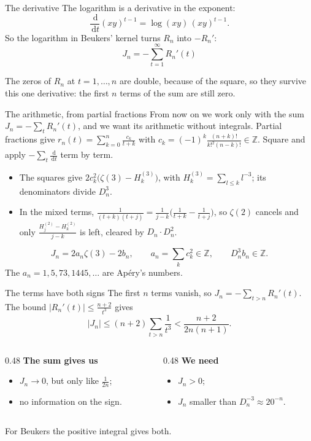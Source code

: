 \documentclass[aspectratio=169,11pt]{beamer}
\newcommand{\Z}{\mathbb{Z}}
\newcommand{\dd}{\,\mathrm{d}}
\newcommand{\Dn}{D_n}
\begin{document}
\begin{frame}{The derivative}
  The logarithm is a derivative in the exponent:
  \[
    \frac{\dd}{\dd t}(xy)^{t-1}=\log(xy)\,(xy)^{t-1}.
  \]
  So the logarithm in Beukers' kernel turns $R_n$ into $-R_n'$:
  \[
    \boxed{\;J_n=-\sum_{t=1}^\infty R_n'(t)\;}
  \]

  \pause
  The zeros of $R_n$ at $t=1,\dots,n$ are double, because of the square, so they survive this one
  derivative: the first $n$ terms of the sum are still zero.
\end{frame}

\begin{frame}{The arithmetic, from partial fractions}
  From now on we work only with the sum $J_n=-\sum_tR_n'(t)$, and we want its arithmetic without
  integrals. Partial fractions give
  $r_n(t)=\sum_{k=0}^n\frac{c_k}{t+k}$ with $c_k=(-1)^k\frac{(n+k)!}{k!^2(n-k)!}\in\Z$.
  Square and apply $-\sum_t\frac{\dd}{\dd t}$ term by term.
  \begin{itemize}
    \item The squares give $2c_k^2\bigl(\zeta(3)-H_k^{(3)}\bigr)$, with $H_k^{(3)}=\sum_{l\le k}l^{-3}$; its
      denominators divide $\Dn^3$.
    \item In the mixed terms, $\frac1{(t+k)(t+j)}=\frac1{j-k}\bigl(\frac1{t+k}-\frac1{t+j}\bigr)$, so $\zeta(2)$
      cancels and only $\frac{H_j^{(2)}-H_k^{(2)}}{j-k}$ is left, cleared by $\Dn\cdot\Dn^2$.
  \end{itemize}
  \[
    J_n=2a_n\zeta(3)-2b_n,\qquad a_n=\sum_kc_k^2\in\Z,\qquad \Dn^3b_n\in\Z .
  \]
  The $a_n=1,5,73,1445,\dots$ are Ap\'ery's numbers.
\end{frame}

\begin{frame}{The terms have both signs}
  The first $n$ terms vanish, so $J_n=-\sum_{t>n}R_n'(t)$. The bound
  $|R_n'(t)|\le\frac{n+2}{t^3}$ gives
  \[
    |J_n|\le(n+2)\sum_{t>n}\frac1{t^3}<\frac{n+2}{2n(n+1)} .
  \]
  \pause
  \begin{columns}[T]
    \begin{column}{0.48\textwidth}
      \textbf{The sum gives us}
      \begin{itemize}
        \item $J_n\to0$, but only like $\frac1{2n}$;
        \item no information on the sign.
      \end{itemize}
    \end{column}
    \begin{column}{0.48\textwidth}
      \textbf{We need}
      \begin{itemize}
        \item $J_n>0$;
        \item $J_n$ smaller than $\Dn^{-3}\approx20^{-n}$.
      \end{itemize}
    \end{column}
  \end{columns}
  \pause
  \medskip

  For Beukers the positive integral gives both.
\end{frame}
\end{document}
